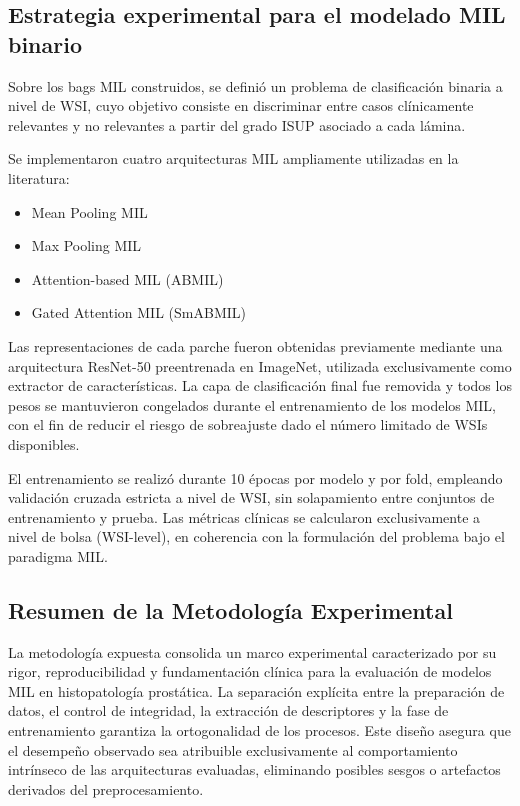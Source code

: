 \subsection{Estrategia experimental para el modelado MIL binario}
\label{subsec:estrategia_mil_binario}
Sobre los bags MIL construidos, se definió un problema de clasificación binaria a nivel de WSI, cuyo objetivo consiste en discriminar entre casos clínicamente relevantes y no relevantes a partir del grado ISUP asociado a cada lámina.

Se implementaron cuatro arquitecturas MIL ampliamente utilizadas en la literatura:

\begin{itemize}
    \item Mean Pooling MIL
    \item Max Pooling MIL
    \item Attention-based MIL (ABMIL)
    \item Gated Attention MIL (SmABMIL)
\end{itemize}

Las representaciones de cada parche fueron obtenidas previamente mediante una arquitectura ResNet-50 preentrenada en ImageNet, utilizada exclusivamente como extractor de características. La capa de clasificación final fue removida y todos los pesos se mantuvieron congelados durante el entrenamiento de los modelos MIL, con el fin de reducir el riesgo de sobreajuste dado el número limitado de WSIs disponibles.\newline

El entrenamiento se realizó durante 10 épocas por modelo y por fold, empleando validación cruzada estricta a nivel de WSI, sin solapamiento entre conjuntos de entrenamiento y prueba. Las métricas clínicas se calcularon exclusivamente a nivel de bolsa (WSI-level), en coherencia con la formulación del problema bajo el paradigma MIL.


\subsection{Resumen de la Metodología Experimental}
La metodología expuesta consolida un marco experimental caracterizado por su rigor, reproducibilidad y fundamentación clínica para la evaluación de modelos MIL en histopatología prostática. La separación explícita entre la preparación de datos, el control de integridad, la extracción de descriptores y la fase de entrenamiento garantiza la ortogonalidad de los procesos. Este diseño asegura que el desempeño observado sea atribuible exclusivamente al comportamiento intrínseco de las arquitecturas evaluadas, eliminando posibles sesgos o artefactos derivados del preprocesamiento.\newline

